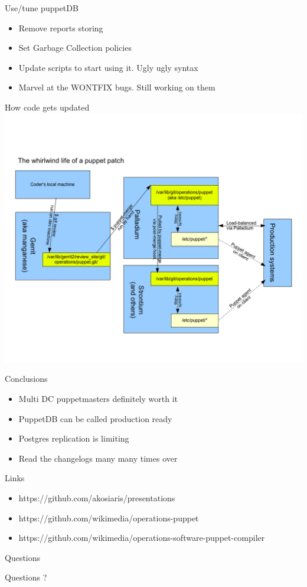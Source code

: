 \documentclass{beamer}
\begin{document}
    \begin{frame}{Use/tune puppetDB}
        \begin{itemize}
            \pause \item Remove reports storing
            \pause \item Set Garbage Collection policies
            \pause \item Update scripts to start using it. Ugly ugly syntax
            \pause \item Marvel at the WONTFIX bugs. Still working on them
        \end{itemize}
    \end{frame}
    \begin{frame}{How code gets updated}
        \includegraphics[width=\textwidth, height=\textheight]{Lifeofpuppetpatch.png}
    \end{frame}
    \begin{frame}{Conclusions}
        \begin{itemize}
            \pause \item Multi DC puppetmasters definitely worth it
            \pause \item PuppetDB can be called production ready
            \pause \item Postgres replication is limiting
            \pause \item Read the changelogs many many times over
        \end{itemize}
    \end{frame}
    \begin{frame}{Links}
        \begin{itemize}
            \item https://github.com/akosiaris/presentations
            \item https://github.com/wikimedia/operations-puppet
            \item https://github.com/wikimedia/operations-software-puppet-compiler
        \end{itemize}
    \end{frame}
    \begin{frame}{Questions}
        \begin{center}
            \Huge Questions ?
        \end{center}
    \end{frame}
\end{document}
